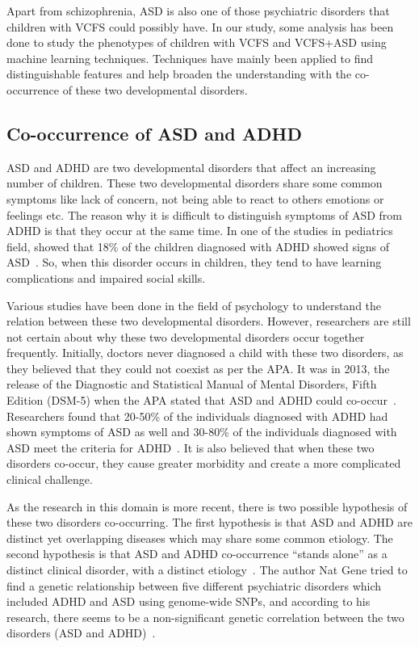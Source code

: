 Apart from schizophrenia, ASD is also one of those psychiatric disorders that children with VCFS could possibly have. In our study, some analysis has been done to study the phenotypes of children with VCFS and VCFS+ASD using machine learning techniques. Techniques have mainly been applied to find distinguishable features and help broaden the understanding with the co-occurrence of these two developmental disorders.

\subsection{Co-occurrence of ASD and ADHD}
ASD and ADHD are two developmental disorders that affect an increasing number of children. These two developmental disorders share some common symptoms like lack of concern, not being able to react to others emotions or feelings etc. The reason why it is difficult to distinguish symptoms of ASD from ADHD is that they occur at the same time. In one of the studies in pediatrics field, showed that 18\% of the children diagnosed with ADHD showed signs of ASD~\cite{kotte2013autistic}. So, when this disorder occurs in children, they tend to have learning complications and impaired social skills.

Various studies have been done in the field of psychology to understand the relation between these two developmental disorders. However, researchers are still not certain about why these two developmental disorders occur together frequently. Initially, doctors never diagnosed a child with these two disorders, as they believed that they could not coexist as per the APA. It was in 2013, the release of the Diagnostic and Statistical Manual of Mental Disorders, Fifth Edition (DSM-5) when the APA stated that ASD and ADHD could co-occur~\cite{american2013diagnostic}. Researchers found that 20-50\% of the individuals diagnosed with ADHD had shown symptoms of ASD as well and 30-80\% of the individuals diagnosed with ASD meet the criteria for ADHD~\cite{rommelse2010shared}. It is also believed that when these two disorders co-occur, they cause greater morbidity and create a more complicated clinical challenge.

As the research in this domain is more recent, there is two possible hypothesis of these two disorders co-occurring. The first hypothesis is that ASD and ADHD are distinct yet overlapping diseases which may share some common etiology. The second hypothesis is that ASD and ADHD co-occurrence “stands alone” as a distinct clinical disorder, with a distinct etiology~\cite{leitner2014co}. The author Nat Gene tried to find a genetic relationship between five different psychiatric disorders which included ADHD and ASD using genome-wide SNPs, and according to his research, there seems to be a non-significant genetic correlation between the two disorders (ASD and ADHD)~\cite{lee2013genetic}. 

